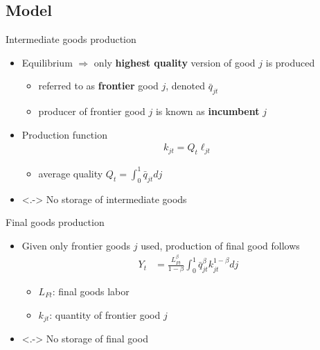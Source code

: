 \documentclass[english,usenames,dvipsnames]{beamer}
\begin{document}
\subsection{Model}

\begin{frame}{Intermediate goods production}\label{intermediate_goods_production}
	\hyperlink{model:production_overview}{}
	\begin{itemize}
		\item<+-> Equilibrium $\Rightarrow$ only \alert{\textbf{highest quality}} version of good $j$ is produced \hyperlink{two_stage_bertrand2}{}
		\begin{itemize}
			\item referred to as \alert{\textbf{frontier}} good $j$, denoted $\bar{q}_{jt}$
			\item producer of frontier good $j$ is known as  \alert{\textbf{incumbent}} $j$ 
		\end{itemize}
		\medskip
		\item<+-> Production function
		\begin{align*}
			k_{jt} = Q_t \ell_{jt}
		\end{align*}
		\begin{itemize}
			\item average quality $Q_t = \int_0^1 \bar{q}_{jt} dj$
		\end{itemize}
		\medskip
		\item<.-> No storage of intermediate goods 
	\end{itemize}
\end{frame}

\begin{frame}{Final goods production}\label{main:final_goods_production}
	\hyperlink{model:production_overview}{}
	\begin{itemize}
		\item<+-> Given only frontier goods $j$ used, production of final good follows
		\begin{align*}
			Y_t &= \frac{L_{Ft}^{\beta}}{1-\beta} \int_0^1 \bar{q}_{jt}^{\beta} k_{jt}^{1-\beta} dj 
		\end{align*}
		\begin{itemize}
			\item $L_{Ft}$: final goods labor
			\item $k_{jt}$: quantity of frontier good $j$
		\end{itemize} \hyperlink{definition:final_goods_production}{} 
		\smallskip
		\item<.-> No storage of final good
	\end{itemize}
\end{frame}
\end{document}
